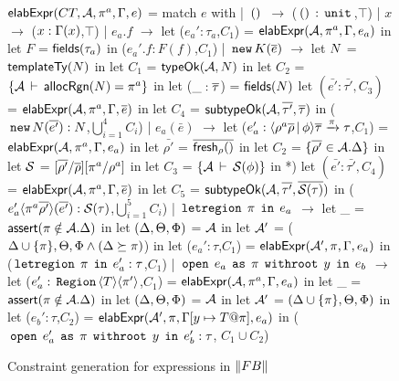 \begin{figure}

\begin{codeml}
${\sf elabExpr}(CT, {\mathcal{A}}, \pi^a, \Gamma, e)$ = 
  match $e$ with
  | $\,{\tt ()}\,$ $\longrightarrow$ ($\,{\tt ()}\,:\,{\tt unit}\,$,$\top$)
  | $x$ $\longrightarrow$ ($x:\Gamma(x)$,$\top$)
  | $e_a.f$ $\longrightarrow$ 
    let ($e_a':\tau_a$,$C_1$) = ${\sf elabExpr}({\mathcal{A}},\pi^a,\Gamma,e_a)$ in
    let $F$ = ${\sf fields}(\tau_a)$ in
      ($e_a'.f:F(f)$,$C_1$)
  | $\,{\tt new}\, K(\overline{e})$ $\longrightarrow$ 
    let $N$ = ${\sf templateTy}(N)$ in
    let $C_1$ = ${\sf typeOk}({{\mathcal{A}}},{N})$ in
    let $C_2$ = $\{{\mathcal{A}}\,\vdash\,{\sf allocRgn}(N)=\pi^a\}$ in
    let ($\_:\overline{\tau}$) = ${\sf fields}(N)$
    let $(\bar{e'}:\bar{\tau'}, C_3)$ = ${\sf elabExpr}({\mathcal{A}},\pi^a,\Gamma,\overline{e})$ in
    let $C_4$ = ${\sf subtypeOk}({{\mathcal{A}}},{\overline{\tau'}},{\overline{\tau}})$ in
      ($\,{\tt new}\, N(\overline{e'}) : N$,$\bigcup_{i=1}^4 C_i$)
  | $e_a(\bar{e})$ $\longrightarrow$ 
    let ($e_a':\langle \rho^a\overline{\rho}\,|\,\phi \rangle\overline{\tau} \xrightarrow{\pi} \tau$,$C_1$) = 
                ${\sf elabExpr}({\mathcal{A}},\pi^a,\Gamma,e_a)$ in
    let $\bar{\rho'}$ = $\overline{{\sf fresh}_\rho()}$ in
    let $C_2$ = $\{\overline{\rho'} \in {\mathcal{A}}.\Delta\}$ in
    let $\mathcal{S}$ = $[\overline{\rho'}/\overline{\rho}][\pi^a/\rho^a]$ in
    let $C_3$ = $\{{\mathcal{A}}\,\vdash\,\mathcal{S}(\phi)\}$ in
*)   let $(\bar{e'}:\bar{\tau'}, C_4)$ = ${\sf elabExpr}({\mathcal{A}},\pi^a,\Gamma,\overline{e})$ in
    let $C_5$ = ${\sf subtypeOk}({{\mathcal{A}}},{\overline{\tau'}},{\overline{\mathcal{S}(\tau)}})$ in
      ($e_a'\langle \pi^a\overline{\rho'} \rangle(\overline{e'}):\mathcal{S}(\tau)$,$\bigcup_{i=1}^5 C_i$)
  | $\,{\tt letregion}\,\;\pi\;\,{\tt in}\,\;e_a$ $\longrightarrow$
    let _ = ${\sf assert}(\pi \notin {\mathcal{A}}.\Delta)$ in
    let $(\Delta,\Theta,\Phi)$ = ${\mathcal{A}}$ in
    let ${\mathcal{A}}'$ = ($\Delta \cup \{\pi\}, \Theta, \Phi \wedge (\Delta \succeq \pi)$) in
    let ($e_a':\tau$,$C_1$) = ${\sf elabExpr}({\mathcal{A}}',\pi,\Gamma,e_a)$ in
      ($\,{\tt letregion}\,\;\pi\;\,{\tt in}\,\;e_a':\tau$,$C_1$)
  | $\,{\tt open}\,\;e_a\;\,{\tt as}\,\;\pi\;\,{\tt withroot}\,\;y\;\,{\tt in}\,\;e_b$ $\longrightarrow$ 
    let ($e_a':\,{\tt Region}\,\langle T \rangle\langle \pi' \rangle$,$C_1$) = 
                ${\sf elabExpr}({\mathcal{A}},\pi^a,\Gamma,e_a)$ in
    let _ = ${\sf assert}(\pi \notin {\mathcal{A}}.\Delta)$ in
    let $(\Delta,\Theta,\Phi)$ = ${\mathcal{A}}$ in
    let ${\mathcal{A}}'$ = $(\Delta \cup \{\pi\},\Theta,\Phi)$ in
    let ($e_b':\tau$,$C_2$) = ${\sf elabExpr}({\mathcal{A}}',\pi,\Gamma[y\mapsto T@\pi],e_a)$ in
      ($\,{\tt open}\,\;e_a'\;\,{\tt as}\,\;\pi\;\,{\tt withroot}\,\;y\;\,{\tt in}\,\;e_b' : \tau$, $C_1 \cup C_2$)
\end{codeml}

\caption{Constraint generation for expressions in $\left\| {\sc FB} \right\|$}
\label{fig:fb-elabexpr}
\end{figure}
